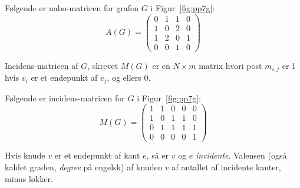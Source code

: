 Følgende er nabo-matricen for grafen $G$ i Figur~\ref{fig:pp7g}:
\begin{equation}
A(G) = \begin{pmatrix}
0 & 1 & 1 & 0 \\
1 & 0 & 2 & 0 \\
1 & 2 & 0 & 1 \\
0 & 0 & 1 & 0
\end{pmatrix}
\end{equation}

\begin{definition}
    Incidens-matricen af $G$, skrevet $M(G)$  er en $N \times m$ matrix hvori post $m_{i,j}$ er 1 hvis $v_{i}$ er et endepunkt af $e_{j}$, og ellers 0.
\end{definition}

Følgende er incidens-matricen for $G$ i Figur~\ref{fig:pp7g}:
\begin{equation}
M(G) = \begin{pmatrix}
1 & 1 & 0 & 0 & 0 \\
1 & 0 & 1 & 1 & 0 \\
0 & 1 & 1 & 1 & 1 \\
0 & 0 & 0 & 0 & 1
\end{pmatrix}
\end{equation}

\begin{definition}
    Hvis knude $v$ er et endepunkt af kant $e$, så er $v$ og $e$ \textit{incidente}. Valensen (også kaldet graden, \textit{degree} på engelsk) af knuden $v$ af antallet af incidente kanter, minus løkker.
\end{definition}


